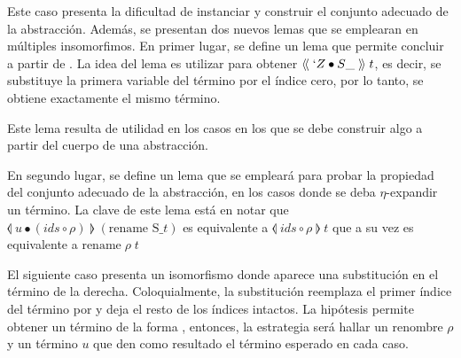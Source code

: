 \documentclass[]{report}
\begin{document}
	Este caso presenta la dificultad de instanciar y construir el conjunto adecuado de la abstracción.
	Además, se presentan dos nuevos lemas que se emplearan en múltiples insomorfimos.
	En primer lugar, se define un lema que permite concluir \snstar{} a partir de \snstar {} .
	La idea del lema es utilizar  para obtener $\langle\!\langle\; `Z \bullet S\_ \;\rangle\!\rangle\;t$, es decir, se substituye la primera variable del término por el índice cero, por lo tanto, se obtiene exactamente el mismo término.
	
	
	Este lema resulta de utilidad en los casos en los que se debe construir algo a partir del cuerpo de una abstracción.
	
	
	En segundo lugar, se define un lema que se empleará para probar la propiedad del conjunto adecuado de la abstracción, en los casos donde se deba $\eta$-expandir un término.
	La clave de este lema está en notar que $\llangle\; u \bullet (ids \circ \rho) \;\rrangle\;(\text{rename S\_ } t)$ es equivalente a $\llangle\; ids \circ \rho \;\rrangle\; t$ que a su vez es equivalente a $\text{rename}\;\rho\; t$
	
	
	
	
	
	El siguiente caso presenta un isomorfismo donde aparece una substitución en el término de la derecha.
	Coloquialmente, la substitución  reemplaza el primer índice del término por
	\AgdaOperator{\AgdaInductiveConstructor{[}}\AgdaSpace{}%
	\AgdaSpace{}%
	\AgdaOperator{\AgdaInductiveConstructor{]≡}}\AgdaSpace{}%
	\AgdaSymbol{(}\AgdaSpace{}%
	\AgdaSymbol{)}
	y deja el resto de los índices intactos.
	La hipótesis  permite obtener un término de la forma
	\snstar
	\AgdaSymbol{(}\AgdaSpace{}%
	\AgdaSpace{}%
	\AgdaSpace{}%
	\AgdaSymbol{(}\AgdaSpace{}%
	\AgdaSpace{}%
	\AgdaSymbol{)}\AgdaSpace{}%
	\AgdaSpace{}%
	\AgdaSymbol{)}
	, entonces, la estrategia será hallar un renombre $\rho$ y un término $u$ que den como resultado el término esperado en cada caso.
	
\end{document}
